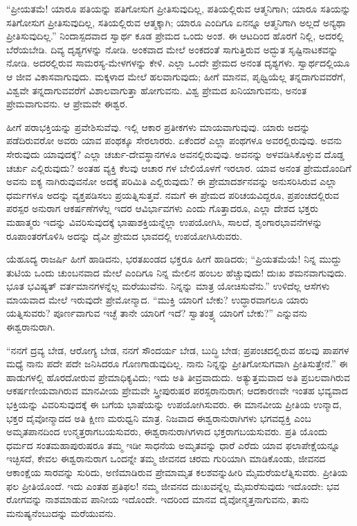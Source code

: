 “ಪ್ರೀಯತಮೆ! ಯಾರೂ ಪತಿಯನ್ನು ಪತಿಗೋಸುಗ ಪ್ರೀತಿಸುವುದಿಲ್ಲ, ಪತಿಯಲ್ಲಿರುವ ಆತ್ಮನಿಗಾಗಿ; ಯಾರೂ ಸತಿಯನ್ನು ಸತಿಗೋಸುಗ ಪ್ರೀತಿಸುವುದಿಲ್ಲ, ಸತಿಯಲ್ಲಿರುವ ಆತ್ಮಕ್ಕಾಗಿ; ಯಾರೂ ಎಂದಿಗೂ ಏನನ್ನೂ ಆತ್ಮನಿಗಾಗಿ ಅಲ್ಲದೆ ಅನ್ಯಥಾ ಪ್ರೀತಿಸುವುದಿಲ್ಲ.” ನಿಂದಾಸ್ಪದವಾದ ಸ್ವಾರ್ಥ ಕೂಡ ಪ್ರೇಮದ ಒಂದು ಅಂಶ. ಈ ಆಟದಿಂದ ಹೊರಗೆ ನಿಲ್ಲಿ, ಅದರಲ್ಲಿ ಬೆರೆಯಬೇಡಿ. ದಿವ್ಯ ದೃಶ್ಯಗಳನ್ನು ನೋಡಿ. ಅಂಕವಾದ ಮೇಲೆ ಅಂಕದಂತೆ ಸಾಗುತ್ತಿರುವ ಅದ್ಭುತ ಸೃಷ್ಟಿನಾಟಕವನ್ನು ನೋಡಿ. ಅದರಲ್ಲಿರುವ ಸಾಮರಸ್ಯ-ಮೇಳಗಳನ್ನು ಕೇಳಿ. ಎಲ್ಲಾ ಒಂದೇ ಪ್ರೇಮದ ಅನಂತ ದೃಶ್ಯಗಳು. ಸ್ವಾರ್ಥದಲ್ಲಿಯೂ ಆ ಜೀವ ವಿಕಾಸವಾಗುವುದು. ಮಕ್ಕಳಾದ ಮೇಲೆ ಹಲವಾಗುವುದು; ಹೀಗೆ ಮಾನವ, ಪೃಥ್ವಿಯೆಲ್ಲ ತನ್ನದಾಗುವವರೆಗೆ, ವಿಶ್ವವೇ ತನ್ನದಾಗುವವರೆಗೆ ವಿಶಾಲವಾಗುತ್ತಾ ಹೋಗುವನು. ವಿಶ್ವ ಪ್ರೇಮದ ಖನಿಯಾಗುವನು, ಅನಂತ ಪ್ರೇಮವಾಗುವನು. ಆ ಪ್ರೇಮವೇ ಈಶ್ವರ.

ಹೀಗೆ ಪರಾಭಕ್ತಿಯನ್ನು ಪ್ರವೇಶಿಸುವೆವು. ಇಲ್ಲಿ ಆಕಾರ ಪ್ರತೀಕಗಳು ಮಾಯವಾಗುವುವು. ಯಾರು ಅದನ್ನು ಪಡೆದಿರುವರೋ ಅವರು ಯಾವ ಪಂಥಕ್ಕೂ ಸೇರಲಾರರು. ಏಕೆಂದರೆ ಎಲ್ಲಾ ಪಂಥಗಳೂ ಅವರಲ್ಲಿರುವುವು. ಅವನು ಸೇರುವುದು ಯಾವುದಕ್ಕೆ? ಎಲ್ಲಾ ಚರ್ಚು-ದೇವಸ್ಥಾನಗಳೂ ಅವನಲ್ಲಿರುವುವು. ಅವನನ್ನು ಅಳವಡಿಸಿಕೊಳ್ಳುವ ದೊಡ್ಡ ಚರ್ಚು ಎಲ್ಲಿರುವುದು? ಅಂತಹ ವ್ಯಕ್ತಿ ಕೆಲವು ಆಚಾರ ಗಳ ಬೇಲಿಯೊಳಗೆ ಇರಲಾರ. ಯಾವ ಅನಂತ ಪ್ರೇಮದೊಂದಿಗೆ ಅವನು ಐಕ್ಯ ನಾಗಿರುವುವನೋ ಅದಕ್ಕೆ ಪರಿಮಿತಿ ಎಲ್ಲಿರುವುದು? ಈ ಪ್ರೇಮಾದರ್ಶನವನ್ನು ಅನುಸರಿಸಿರುವ ಎಲ್ಲಾ ಧರ್ಮಗಳೂ ಅದನ್ನು ವ್ಯಕ್ತಪಡಿಸಲು ಪ್ರಯತ್ನಿಸುತ್ತವೆ. ನಮಗೆ ಈ ಪ್ರೇಮದ ಪರಿಚಯವಿದ್ದರೂ, ಪ್ರಪಂಚದಲ್ಲಿರುವ ಪರಸ್ಪರ ಅನುರಾಗ ಆಕರ್ಷಣೆಗಳೆಲ್ಲ ಇದರ ಆವಿರ್ಭಾವಗಳು ಎಂದು ಗೊತ್ತಾದರೂ, ಎಲ್ಲಾ ದೇಶದ ಭಕ್ತರು ಮಹಾತ್ಮರು ಇದನ್ನು ವಿವರಿಸುವುದಕ್ಕೆ ಭಾಷಾಶಕ್ತಿಯನ್ನೆಲ್ಲಾ ಉಪಯೋಗಿಸಿ, ಸಾಲದೆ, ಶೃಂಗಾರಭಾವನೆಗಳನ್ನು ರೂಪಾಂತರಗೊಳಿಸಿ ಅದನ್ನು ದೈವೀ ಪ್ರೇಮದ ಭಾವದಲ್ಲಿ ಉಪಯೋಗಿಸಿರುವರು.

ಯೆಹೂದ್ಯ ರಾಜರ್ಷಿ ಹೀಗೆ ಹಾಡಿದನು, ಭರತಖಂಡದ ಭಕ್ತರೂ ಹೀಗೆ ಹಾಡಿದರು; “ಪ್ರಿಯತಮೆಯೆ! ನಿನ್ನ ಮುದ್ದು ತುಟಿಯ ಒಂದು ಚುಂಬನವಾದ ಮೇಲೆ ಎಂದಿಗೂ ನಿನ್ನ ಮೇಲಿನ ಹಂಬಲ ಹೆಚ್ಚುವುದು! ದುಃಖ ಶಮನವಾಗುವುದು. ಭೂತ ಭವಿಷ್ಯತ್​ ವರ್ತಮಾನಗಳನ್ನೆಲ್ಲ ಮರೆಯುವೆನು. ನಿನ್ನನ್ನು ಮಾತ್ರ ಯೋಚಿಸುವೆನು.” ಉಳಿದೆಲ್ಲ ಆಸೆಗಳು ಮಾಯವಾದ ಮೇಲೆ ಇರುವುದೇ ಪ್ರೇಮೋನ್ಮಾದ. “ಮುಕ್ತಿ ಯಾರಿಗೆ ಬೇಕು? ಉದ್ಧಾರ\-ವಾಗಲೂ ಯಾರು ಯತ್ನಿಸುವರು? ಪೂರ್ಣವಾಗುವ ಇಚ್ಛೆ ತಾನೇ ಯಾರಿಗೆ ಇದೆ? ಸ್ವಾತಂತ್ರ್ಯ ಯಾರಿಗೆ ಬೇಕು?” ಎನ್ನುವನು ಈಶ್ವರಾನುರಾಗಿ.

“ನನಗೆ ದ್ರವ್ಯ ಬೇಡ, ಆರೋಗ್ಯ ಬೇಡ, ನನಗೆ ಸೌಂದರ್ಯ ಬೇಡ, ಬುದ್ಧಿ ಬೇಡ; ಪ್ರಪಂಚದಲ್ಲಿರುವ ಹಲವು ಪಾಪಗಳ ಮಧ್ಯೆ ನಾನು ಪದೇ ಪದೇ ಜನಿಸಿದರೂ ಗೊಣಗಾಡುವುದಿಲ್ಲ. ನಾನು ನಿನ್ನನ್ನು ಪ್ರೀತಿಗೋಸುಗವಾಗಿ ಪ್ರೀತಿಸುತ್ತೇನೆ.” ಈ ಹಾಡುಗಳಲ್ಲಿ ಹೊರದೋರುವ ಪ್ರೇಮಾಧಿಕ್ಯವಿದು; ಇದು ಅತಿ ತೀವ್ರವಾದುದು. ಅತ್ಯುತ್ತಮವಾದ ಅತಿ ಪ್ರಬಲವಾಗಿರುವ ಆಕರ್ಷಣೀಯವಾಗಿರುವ ಮಾನವೀಯ ಪ್ರೇಮವೇ ಸ್ತ್ರೀಪುರುಷರ ಪರಸ್ಪರಾನುರಾಗ; ಆದಕಾರಣವೇ ಇಂತಹ ಭವ್ಯವಾದ ಭಕ್ತಿಯನ್ನು ವಿವರಿಸುವುದಕ್ಕೆ ಈ ಬಗೆಯ ಭಾಷೆಯನ್ನು ಉಪಯೋಗಿಸುವರು. ಈ ಮಾನವೀಯ ಪ್ರೀತಿಯ ಉನ್ಮಾದ, ಭಕ್ತರ ದೈವೋನ್ಮಾದದ ಅತಿ ಕ್ಷೀಣ ಮರುಧ್ವನಿ ಮಾತ್ರ. ನಿಜವಾದ ಈಶ್ವರಾನುರಾಗಿಗಳು ಭಗವದ್ಭಕ್ತಿ ಎಂಬ ಅಮೃತಪಾನದಿಂದ ಉನ್ಮತ್ತರಾಗಬಯಸುವರು, ಈಶ್ವರಾನುರಾಗಿಗಳಾದ ಭಕ್ತರಾಗಬಯಸುವರು. ಪ್ರತಿ ಯೊಂದು ಧರ್ಮದ ಸಂತಮಹಾಪುರುಷರೂ ತಮ್ಮ ಇಡೀ ಸಾಧನೆಯ ಅಮೃತವನ್ನು ಧಾರೆ ಎರೆದು ಯಾವ ಫಲಾಪೇಕ್ಷೆಯನ್ನೂ ಇಚ್ಛಿಸದೆ, ಕೇವಲ ಈಶ್ವರಾನುರಾಗ ಒಂದನ್ನೇ ತಮ್ಮ ಜೀವನದ ಚರಮ ಗುರಿಯಾಗಿ ಮಾಡಿಕೊಂಡು, ಜೀವನದ ಆಕಾಂಕ್ಷೆಯ ಸಾರವನ್ನು ಸುರಿದು, ಅಣಿಮಾಡಿರುವ ಪ್ರೇಮಾಮೃತ ಕಲಶವನ್ನುಹೀರಿ ಮೈಮರೆಯಲೆತ್ನಿಸುವರು. ಪ್ರೀತಿಯ ಫಲ ಪ್ರೀತಿಯೊಂದೆ. ಇದು ಎಂತಹ ಪ್ರತಿಫಲ! ನಮ್ಮ ಜೀವನದ ದುಃಖವನ್ನೆಲ್ಲ ಮೈಮರೆಸುವುದು ಇದೊಂದೇ: ಭವ ರೋಗವನ್ನು ನಾಶಮಾಡುವ ಪಾನೀಯ ಇದೊಂದೇ. ಇದರಿಂದ ಮಾನವ ದೈವೋನ್ಮತ್ತನಾಗುವನು, ತಾನು ಮನುಷ್ಯನೆಂಬುದನ್ನು ಮರೆಯುವನು.

